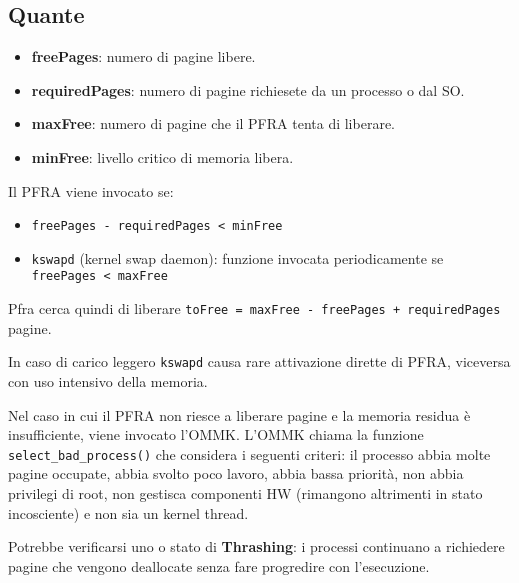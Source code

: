 \documentclass[12pt, a4paper]{report}
\begin{document}
\subsection{Quante}
\begin{itemize}
	\item \textbf{freePages}: numero di pagine libere.
	\item \textbf{requiredPages}: numero di pagine richiesete da un processo o
		dal SO.
	\item \textbf{maxFree}: numero di pagine che il PFRA tenta di liberare.
	\item \textbf{minFree}: livello critico di memoria libera.
\end{itemize}
Il PFRA viene invocato se:
\begin{itemize}
	\item \texttt{freePages - requiredPages < minFree}
	\item \texttt{kswapd} (kernel swap daemon): funzione invocata periodicamente
		se \texttt{freePages < maxFree}
\end{itemize}
Pfra cerca quindi di liberare \texttt{toFree = maxFree - freePages +
requiredPages} pagine.

In caso di carico leggero \texttt{kswapd} causa rare attivazione dirette di
PFRA, viceversa con uso intensivo della memoria.

Nel caso in cui il PFRA non riesce a liberare pagine e la memoria residua è
insufficiente, viene invocato l'OMMK. L'OMMK chiama la funzione
\texttt{select\_bad\_process()} che considera i seguenti criteri: il processo
abbia molte pagine occupate, abbia svolto poco lavoro, abbia bassa priorità,
non abbia privilegi di root, non gestisca componenti HW (rimangono altrimenti in
stato incosciente) e non sia un kernel thread.

Potrebbe verificarsi uno o stato di \textbf{Thrashing}: i processi
continuano a richiedere pagine che vengono deallocate senza fare progredire con
l'esecuzione.
\end{document}
